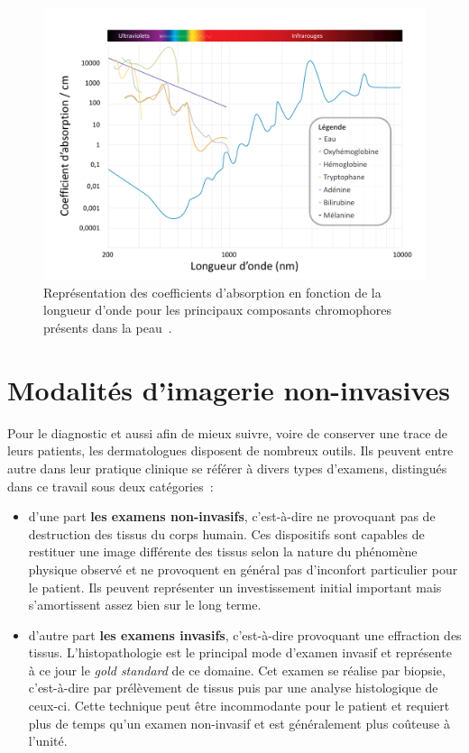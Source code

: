\begin{figure}[H]
    \centering
    \includegraphics[width=\linewidth]{contents/chapter_2/resources/scheme_light_absorption.pdf}
    \caption{Représentation des coefficients d'absorption en fonction de la longueur d'onde pour les principaux composants chromophores présents dans la peau~\cite{Raulin2013}.}
    \label{fig:scheme_light_absorption}
\end{figure}
 
\clearpage

\section{Modalités d’imagerie non-invasives}
Pour le diagnostic et aussi afin de mieux suivre, voire de conserver une trace de leurs patients, les dermatologues disposent de nombreux outils. Ils peuvent entre autre dans leur pratique clinique se référer à divers types d’examens, distingués dans ce travail sous deux catégories~:
\begin{itemize}
    \item d’une part \textbf{les examens non-invasifs}, c’est-à-dire ne provoquant pas de destruction des tissus du corps humain. Ces dispositifs sont capables de restituer une image différente des tissus selon la nature du phénomène physique observé et ne provoquent en général pas d’inconfort particulier pour le patient. Ils peuvent représenter un investissement initial important mais s'amortissent assez bien sur le long terme. 
    \item d’autre part \textbf{les examens invasifs}, c’est-à-dire provoquant une effraction des tissus. L'histopathologie est le principal mode d'examen invasif et représente à ce jour le \textit{gold standard} de ce domaine. Cet examen se réalise par biopsie, c’est-à-dire par prélèvement de tissus puis par une analyse histologique de ceux-ci. Cette technique peut être incommodante pour le patient et requiert plus de temps qu'un examen non-invasif et est généralement plus coûteuse à l'unité.
\end{itemize}\par

